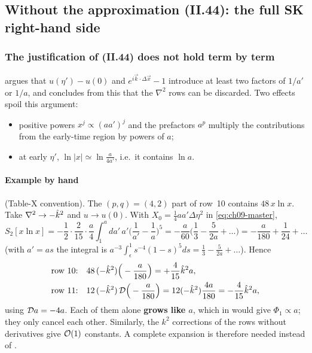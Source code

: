 \subsection{Without the approximation (II.44): the full SK right-hand side}
\label{sec:t18-full}

\subsubsection{The justification of (II.44) does not hold term by term}
\PII{} argues that $u(\eta')-u(0)$ and $e^{i\vec k\cdot\Delta\vec x}-1$ introduce at least two factors of $1/a'$ or $1/a$, and concludes from this that the $\nabla^2$ rows can be discarded.
Two effects spoil this argument:
\begin{itemize}[leftmargin=14pt]
\item positive powers $x^j\propto(aa')^j$ and the prefactors $a^p$ multiply the contributions from the early-time region by powers of $a$;
\item at early $\eta'$, $\ln|x|\simeq\ln\frac{a}{4a'}$, i.e.\ it contains $\ln a$.
\end{itemize}

\paragraph{Example by hand} \tD{} (Table-X convention). The $(p,q)=(4,2)$ part of row~10 contains $48\,x\ln x$. Take $\nabla^2\to-\hat k^2$ and $u\to u(0)$. With
$X_0=\tfrac14aa'\Delta\eta^2$ in \eqref{eq:ch09-master},
\begin{equation}
S_2[x\ln x]=-\frac12\cdot\frac2{15}\cdot\frac a4\int_1^a\!da'\,a'\Big(\frac1{a'}-\frac1a\Big)^5=-\frac a{60}\Big(\frac13-\frac5{2a}+\ldots\Big)=-\frac{a}{180}+\frac1{24}+\ldots
\label{eq:ch09-S2xlnx}
\end{equation}
(with $a'=as$ the integral is $a^{-3}\int_\epsilon^1s^{-4}(1-s)^5ds=\tfrac13-\tfrac5{2a}+\ldots$). Hence
\begin{equation}
\begin{aligned}
&\text{row 10:}\quad 48\,(-\hat k^2)\Big(-\frac a{180}\Big)=+\frac4{15}\hat k^2a,\\
&\text{row 11:}\quad 12\,(-\hat k^2)\,\mathcal{D}\Big(-\frac a{180}\Big)=12(-\hat k^2)\frac{4a}{180}=-\frac4{15}\hat k^2a,
\end{aligned}
\label{eq:ch09-row1011}
\end{equation}
using $\mathcal{D} a=-4a$. Each of them alone \textbf{grows like $a$}, which in  would give $\Phi_1\propto a$; they only cancel each other.
Similarly, the $k^2$ corrections of the rows without derivatives give $\mathcal{O}\!\left(1\right)$ constants. A complete expansion is therefore needed instead of .

